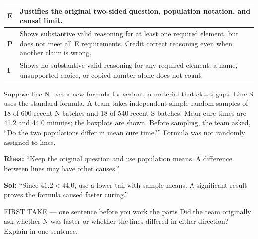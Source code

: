 \documentclass[11pt]{article}
\begin{document}
{\small\renewcommand{\arraystretch}{1.25}
\noindent\begin{tabular}{|p{0.5in}|p{5.9in}|}
\hline
\textbf{E} & Justifies the original two-sided question, population notation, and causal limit. \\ \hline
\textbf{P} & Shows substantive valid reasoning for at least one required element, but does not meet all E requirements. Credit correct reasoning even when another claim is wrong. \\ \hline
\textbf{I} & Shows no substantive valid reasoning for any required element; a name, unsupported choice, or copied number alone does not count. \\ \hline
\end{tabular}}

\clearpage
{}

Suppose line N uses a new formula for sealant, a material that closes gaps. Line S uses the standard formula. A team takes independent simple random samples of 18 of 600 recent N batches and 18 of 540 recent S batches. Mean cure times are 41.2 and 44.0 minutes; the boxplots are shown. Before sampling, the team asked, ``Do the two populations differ in mean cure time?'' Formula was not randomly assigned to lines.\par\smallskip \textbf{Rhea:} ``Keep the original question and use population means. A difference between lines may have other causes.''\par \textbf{Sol:} ``Since $41.2<44.0$, use a lower tail with sample means. A significant result proves the formula caused faster curing.''\par
\begin{center}
\end{center}
\begin{firsttakebox}{FIRST TAKE --- one sentence before you work the parts}
Did the team originally ask whether N was faster or whether the lines differed in either direction? Explain in one sentence.\par
{}
\end{firsttakebox}
\end{document}

